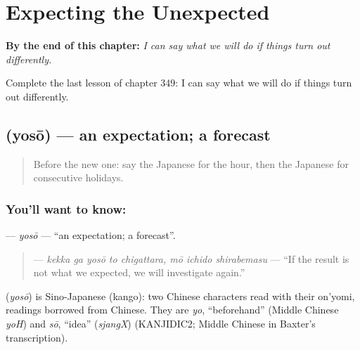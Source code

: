 
\chapter{Expecting the Unexpected}
\label{ch:ja-expecting-the-unexpected}

\begin{chapteropening}
\textbf{By the end of this chapter:} \emph{I can say what we will do if things turn out differently.}

Complete the last lesson of chapter 349: I can say what we will do if things turn out differently.
\end{chapteropening}

\section[\texorpdfstring{\ja{よそう} (yosō)}{よそう (yosō)}]{ (yosō) — an expectation; a forecast}

\label{lesson:JA-C349-yosou}



\begin{quote}
Before the new one: say the Japanese for the hour, then the Japanese for consecutive holidays.
\end{quote}

\subsection*{You'll want to know: }
\textbf{} — \emph{yosō} — \textquotedblleft{}an expectation; a forecast\textquotedblright{}.

\begin{quote}
\textbf{    } — \emph{kekka ga yosō to chigattara, mō ichido shirabemasu} — \textquotedblleft{}If the result is not what we expected, we will investigate again.\textquotedblright{}
\end{quote}

\begin{cousinweb}
\textbf{} (\emph{yosō}) is Sino-Japanese (kango): two Chinese characters read with their on'yomi, readings borrowed from Chinese. They are \emph{yo}, \textquotedblleft{}beforehand\textquotedblright{} (Middle Chinese \emph{yoH}) and \emph{sō}, \textquotedblleft{}idea\textquotedblright{} (\emph{sjangX}) (KANJIDIC2; Middle Chinese in Baxter's transcription).
\end{cousinweb}

